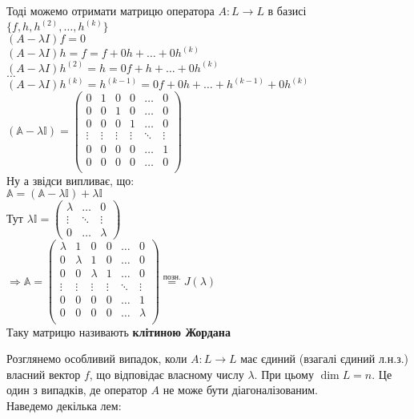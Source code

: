 \documentclass[a4paper, 10pt]{article}
\theoremstyle{theoremdd}
\begin{document}
Тоді можемо отримати матрицю оператора $A: L \to L$ в базисі $\{f,h,h^{(2)},\dots,h^{(k)}\}$\\
$(A-\lambda I)f = 0$\\
$(A-\lambda I)h = f = f + 0h + \dots + 0h^{(k)}$\\
$(A-\lambda I)h^{(2)} = h = 0f + h + \dots + 0h^{(k)}$\\
$\dots$\\
$(A-\lambda I)h^{(k)} = h^{(k-1)} = 0f + 0h + \dots + h^{(k-1)} + 0h^{(k)}$\\
$(\mathbb{A}- \lambda \mathbb{I}) = \begin{pmatrix}
0 & 1 & 0 & 0 & \dots & 0 \\
0 & 0 & 1 & 0 & \dots & 0 \\
0 & 0 & 0 & 1 & \dots & 0 \\
\vdots & \vdots & \vdots & \vdots & \ddots & \vdots \\
0 & 0 & 0 & 0 & \dots & 1 \\
0 & 0 & 0 & 0 & \dots & 0 \\
\end{pmatrix}$\\
Ну а звідси випливає, що:\\
$\mathbb{A} = (\mathbb{A} - \lambda \mathbb{I}) + \lambda \mathbb{I}$\\
Тут $\lambda \mathbb{I} = \begin{pmatrix}
\lambda & \dots & 0\\
\vdots & \ddots & \vdots\\
0 & \dots & \lambda
\end{pmatrix}$\\
$\Rightarrow \mathbb{A} = \begin{pmatrix}
\lambda & 1 & 0 & 0 & \dots & 0 \\
0 & \lambda & 1 & 0 & \dots & 0 \\
0 & 0 & \lambda & 1 & \dots & 0 \\
\vdots & \vdots & \vdots & \vdots & \ddots & \vdots \\
0 & 0 & 0 & 0 & \dots & 1 \\
0 & 0 & 0 & 0 & \dots & \lambda \\
\end{pmatrix} \overset{\textrm{позн.}}{=} J(\lambda)$\\
Таку матрицю називають \textbf{клітиною Жордана}
\fi

Розглянемо особливий випадок, коли $A: L \to L$ має єдиний (взагалі єдиний л.н.з.) власний вектор $f$, що відповідає власному числу $\lambda$. При цьому $\dim L = n$. Це один з випадків, де оператор $A$ не може бути діагоналізованим.\\
Наведемо декілька лем:
\end{document}
